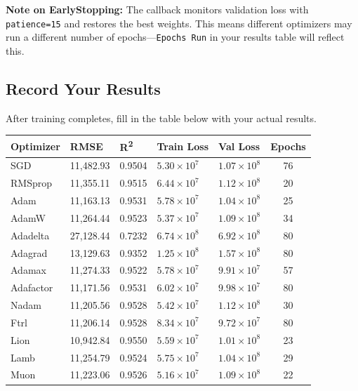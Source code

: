\documentclass[12pt,a4paper]{article}
\begin{document}
\begin{notebox}
\textbf{Note on EarlyStopping:} The callback monitors validation loss with
\texttt{patience=15} and restores the best weights. This means different optimizers
may run a different number of epochs—\texttt{Epochs Run} in your results table will
reflect this.
\end{notebox}

\subsection{Record Your Results}

After training completes, fill in the table below with your actual results.

\begin{center}
\renewcommand{\arraystretch}{1.4}
\begin{tabularx}{\textwidth}{|l|X|X|X|X|c|}
\hline
\textbf{Optimizer} & \textbf{RMSE} & \textbf{R\textsuperscript{2}} & \textbf{Train Loss} & \textbf{Val Loss} & \textbf{Epochs} \\
\hline
SGD & 11,482.93 & 0.9504 & $5.30\times10^{7}$ & $1.07\times10^{8}$ & 76 \\
RMSprop & 11,355.11 & 0.9515 & $6.44\times10^{7}$ & $1.12\times10^{8}$ & 20 \\
Adam & 11,163.13 & 0.9531 & $5.78\times10^{7}$ & $1.04\times10^{8}$ & 25 \\
AdamW & 11,264.44 & 0.9523 & $5.37\times10^{7}$ & $1.09\times10^{8}$ & 34 \\
Adadelta & 27,128.44 & 0.7232 & $6.74\times10^{8}$ & $6.92\times10^{8}$ & 80 \\
Adagrad & 13,129.63 & 0.9352 & $1.25\times10^{8}$ & $1.57\times10^{8}$ & 80 \\
Adamax & 11,274.33 & 0.9522 & $5.78\times10^{7}$ & $9.91\times10^{7}$ & 57 \\
Adafactor & 11,171.56 & 0.9531 & $6.02\times10^{7}$ & $9.98\times10^{7}$ & 80 \\
Nadam & 11,205.56 & 0.9528 & $5.42\times10^{7}$ & $1.12\times10^{8}$ & 30 \\
Ftrl & 11,206.14 & 0.9528 & $8.34\times10^{7}$ & $9.72\times10^{7}$ & 80 \\
Lion & 10,942.84 & 0.9550 & $5.59\times10^{7}$ & $1.01\times10^{8}$ & 23 \\
Lamb & 11,254.79 & 0.9524 & $5.75\times10^{7}$ & $1.04\times10^{8}$ & 29 \\
Muon & 11,223.06 & 0.9526 & $5.16\times10^{7}$ & $1.09\times10^{8}$ & 22 \\
\end{tabularx}
\end{center}
\end{document}
